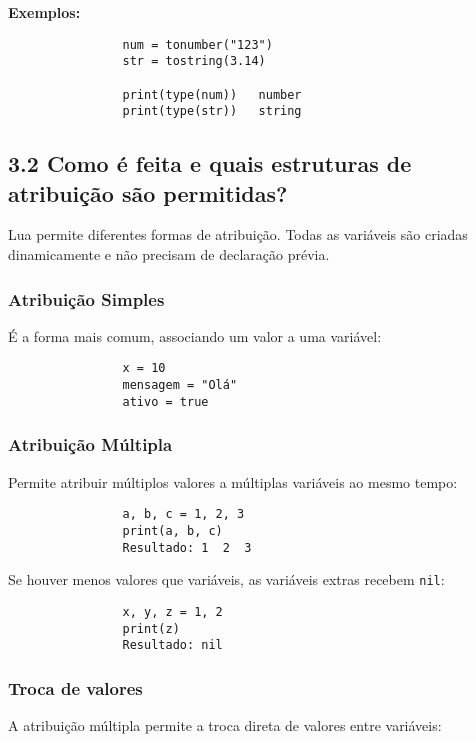 \documentclass[12pt,a4paper]{article}
\begin{document}
			\textbf{Exemplos:}
			\begin{verbatim}
				num = tonumber("123")
				str = tostring(3.14)
				
				print(type(num))   number
				print(type(str))   string
			\end{verbatim}
			
			\subsection*{3.2 Como é feita e quais estruturas de atribuição são permitidas?}
			
			Lua permite diferentes formas de atribuição. Todas as variáveis são criadas dinamicamente e não precisam de declaração prévia.
			
			\subsubsection*{Atribuição Simples}
			
			É a forma mais comum, associando um valor a uma variável:
			
			\begin{verbatim}
				x = 10
				mensagem = "Olá"
				ativo = true
			\end{verbatim}
			
			\subsubsection*{Atribuição Múltipla}
			
			Permite atribuir múltiplos valores a múltiplas variáveis ao mesmo tempo:
			
			\begin{verbatim}
				a, b, c = 1, 2, 3
				print(a, b, c)
				Resultado: 1  2  3
			\end{verbatim}
			
			Se houver menos valores que variáveis, as variáveis extras recebem \verb|nil|:
			
			\begin{verbatim}
				x, y, z = 1, 2
				print(z) 
				Resultado: nil
			\end{verbatim}
			
			\subsubsection*{Troca de valores}
			
			A atribuição múltipla permite a troca direta de valores entre variáveis:
			
\end{document}
